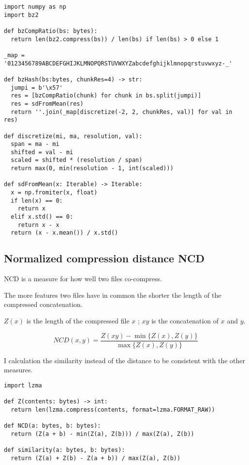 \documentclass[../main.tex]{subfiles}
\begin{document}
\begin{lstlisting}[style=pymd]
import numpy as np
import bz2

def bzCompRatio(bs: bytes):
  return len(bz2.compress(bs)) / len(bs) if len(bs) > 0 else 1

_map = '0123456789ABCDEFGHIJKLMNOPQRSTUVWXYZabcdefghijklmnopqrstuvwxyz-_'

def bzHash(bs:bytes, chunkRes=4) -> str:
  jumpi = b'\x57'
  res = [bzCompRatio(chunk) for chunk in bs.split(jumpi)]
  res = sdFromMean(res)
  return ''.join(_map[discretize(-2, 2, chunkRes, val)] for val in res)

def discretize(mi, ma, resolution, val):
  span = ma - mi
  shifted = val - mi
  scaled = shifted * (resolution / span)
  return max(0, min(resolution - 1, int(scaled)))

def sdFromMean(x: Iterable) -> Iterable:
  x = np.fromiter(x, float)
  if len(x) == 0:
    return x
  elif x.std() == 0:
    return x - x
  return (x - x.mean()) / x.std()
\end{lstlisting}

\subsection{Normalized compression distance NCD}

NCD is a measure for how well two files co-compress.

The more features two files have in common the shorter the length of the compressed concatenation.

$Z(x)$ is the length of the compressed file $x$ ; $xy$ is the concatenation of $x$ and $y$.

\begin{equation}
  NCD(x,y) = \dfrac{Z(xy) - \min \{Z(x),Z(y)\}}{\max \{Z(x),Z(y)\}}
\end{equation}

I calculation the similarity instead of the distance to be consistent with the other measures.

\begin{lstlisting}[style=pymd]
import lzma

def Z(contents: bytes) -> int:
  return len(lzma.compress(contents, format=lzma.FORMAT_RAW))

def NCD(a: bytes, b: bytes):
  return (Z(a + b) - min(Z(a), Z(b))) / max(Z(a), Z(b))

def similarity(a: bytes, b: bytes):
  return (Z(a) + Z(b) - Z(a + b)) / max(Z(a), Z(b))
\end{lstlisting}
\end{document}
